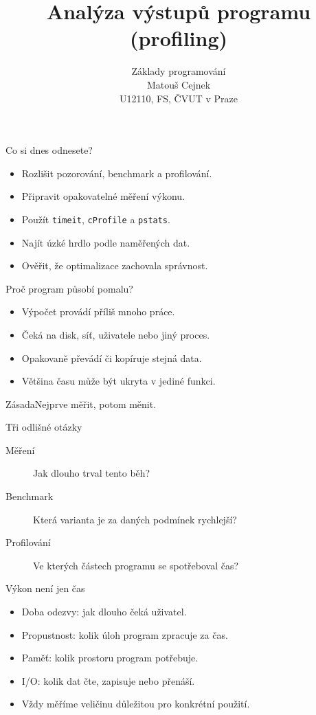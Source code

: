 \documentclass[aspectratio=169]{beamer}
\title{Analýza výstupů programu (profiling)}
\subtitle{Základy programování\\Matouš Cejnek\\U12110, FS, ČVUT v Praze}
\author{}\institute{}\date{}
\begin{document}
\begin{frame}\clearpage\thispagestyle{empty}\titlepage\end{frame}

\begin{frame}{Co si dnes odnesete?}
\begin{itemize}
\item Rozlišit pozorování, benchmark a profilování.
\item Připravit opakovatelné měření výkonu.
\item Použít \texttt{timeit}, \texttt{cProfile} a \texttt{pstats}.
\item Najít úzké hrdlo podle naměřených dat.
\item Ověřit, že optimalizace zachovala správnost.
\end{itemize}
\end{frame}

\begin{frame}{Proč program působí pomalu?}
\begin{itemize}
\item Výpočet provádí příliš mnoho práce.
\item Čeká na disk, síť, uživatele nebo jiný proces.
\item Opakovaně převádí či kopíruje stejná data.
\item Většina času může být ukryta v jediné funkci.
\end{itemize}
\begin{block}{Zásada}Nejprve měřit, potom měnit.\end{block}
\end{frame}

\begin{frame}{Tři odlišné otázky}
\begin{description}
\item[Měření] Jak dlouho trval tento běh?
\item[Benchmark] Která varianta je za daných podmínek rychlejší?
\item[Profilování] Ve kterých částech programu se spotřeboval čas?
\end{description}
\end{frame}

\begin{frame}{Výkon není jen čas}
\begin{itemize}
\item Doba odezvy: jak dlouho čeká uživatel.
\item Propustnost: kolik úloh program zpracuje za čas.
\item Paměť: kolik prostoru program potřebuje.
\item I/O: kolik dat čte, zapisuje nebo přenáší.
\item Vždy měříme veličinu důležitou pro konkrétní použití.
\end{itemize}
\end{frame}
\end{document}
